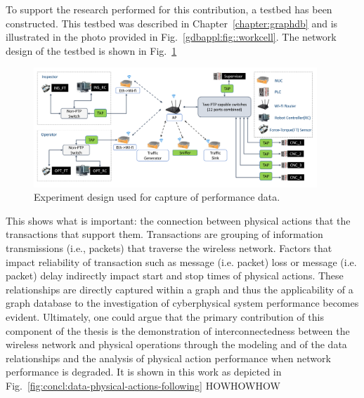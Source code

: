 To support the research performed for this contribution, a testbed has been constructed. This testbed was described in Chapter~\ref{chapter:graphdb} and is illustrated in the photo provided in Fig.~\ref{gdbappl:fig::workcell}.  The network design of the testbed is shown in Fig.~\ref{fig:concl:experiment-design}

\begin{figure}[!ht]
	\centering
	\includegraphics[width=0.95\textwidth]{chapter-gdb-appl/figures/Fig1TiiSpecialDiagram-testbed2.png}
	\caption{Experiment design used for capture of performance data.}
	\label{fig:concl:experiment-design}
\end{figure}

This shows what is important: the connection between physical actions that the transactions that support them.  Transactions are grouping of information transmissions (i.e., packets) that traverse the wireless network.  Factors that impact reliability of transaction such as message (i.e. packet) loss or message (i.e. packet) delay indirectly impact start and stop times of physical actions.  These relationships are directly captured within a graph and thus the applicability of a graph database to the investigation of cyberphysical system performance becomes evident.  Ultimately, one could argue that the primary contribution of this component of the thesis is the demonstration of interconnectedness between the wireless network and physical operations through the modeling and of the data relationships and the analysis of physical action performance when network performance is degraded.  It is shown in this work as depicted in Fig.~\ref{fig:concl:data-physical-actions-following} HOWHOWHOW


